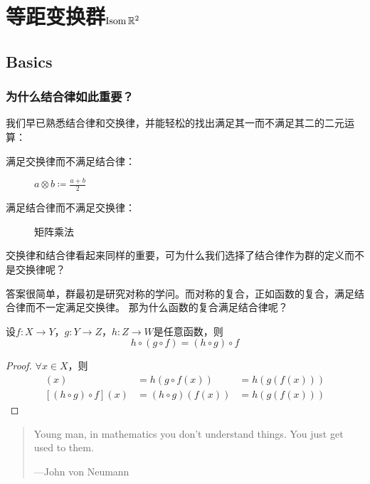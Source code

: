 \chapter{等距变换群\(\operatorname{\mathrm{Isom}} \mathbb{R}^{2}\)}

\section{Basics}

\subsection{为什么结合律如此重要？}
我们早已熟悉结合律和交换律，并能轻松的找出满足其一而不满足其二的二元运算：

\begin{description}
    \item[满足交换律而不满足结合律：] \(a \otimes b \coloneqq \frac{a+b}{2}\)
    \item[满足结合律而不满足交换律：] 矩阵乘法
\end{description}

交换律和结合律看起来同样的重要，可为什么我们选择了结合律作为群的定义而不是交换律呢？

答案很简单，群最初是研究对称的学问。而对称的复合，正如函数的复合，满足结合律而不一定满足交换律。
那为什么函数的复合满足结合律呢？

\begin{theorem}
    设\(f: X\to Y\)，\(g: Y\to Z\)，\(h: Z\to W\)是任意函数，则
    \[
        h\circ(g\circ f)=(h\circ g)\circ f
    \]
\end{theorem}

\begin{proof}
    \(\forall x\in X\)，则
    \begin{align*}
        [h\circ(g\circ f)](x) & = h(g \circ f(x))  & = h(g(f(x))) \\
        [(h\circ g)\circ f](x) & = (h\circ g)(f(x)) & = h(g(f(x)))
    \end{align*}
\end{proof}

\begin{quote}
    Young man, in mathematics you don't understand things.
    You just get used to them.

    \hfill ---John von Neumann
\end{quote}

